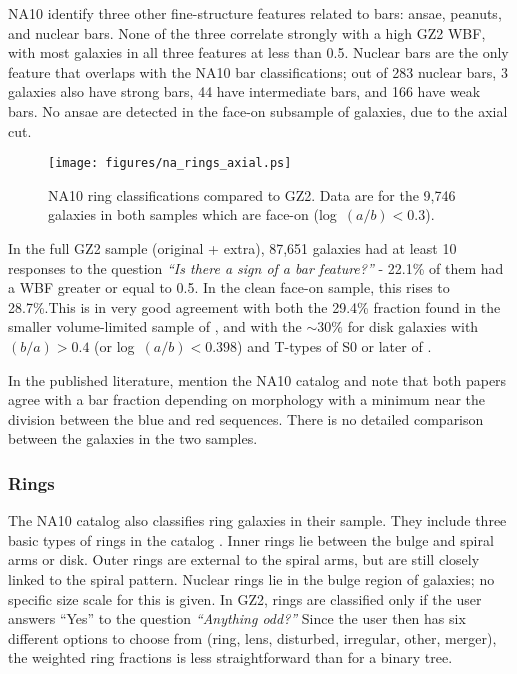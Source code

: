 \documentclass[useAMS,usenatbib]{mn2e}
\begin{document}
NA10 identify three other fine-structure features related to bars: ansae, peanuts, and nuclear bars. None of the three correlate strongly with a high GZ2 WBF, with most galaxies in all three features at less than 0.5. Nuclear bars are the only feature that overlaps with the NA10 bar classifications; out of 283 nuclear bars, 3 galaxies also have strong bars, 44 have intermediate bars, and 166 have weak bars. No ansae are detected in the face-on subsample of galaxies, due to the axial cut. 

\begin{figure*}
\texttt{[image: figures/na\_rings\_axial.ps]}
\caption{NA10 ring classifications compared to GZ2. Data are for the 9,746 galaxies in both samples which are face-on (log~$(a/b)<0.3$). 
\label{fig-na_rings}}
\end{figure*}

In the full GZ2 sample (original + extra), 87,651 galaxies had at least 10 responses to the question {\it ``Is there a sign of a bar feature?''}  - 22.1\% of them had a WBF greater or equal to 0.5. In the clean face-on sample, this rises to 28.7\%.This is in very good agreement with both the 29.4\% fraction found in the smaller volume-limited sample of \citet{mas11c}, and with the $\sim30\%$ for disk galaxies with $(b/a)>0.4$ (or log~$(a/b)<0.398$) and T-types of S0 or later of \citet{nai10a}. 

In the published literature, \citep{mas11c} mention the NA10 catalog and note that both papers agree with a bar fraction depending on morphology with a minimum near the division between the blue and red sequences. There is no detailed comparison between the galaxies in the two samples.

\subsubsection{Rings}

The NA10 catalog also classifies ring galaxies in their sample. They include three basic types of rings in the catalog \citep{but96}. Inner rings lie between the bulge and spiral arms or disk. Outer rings are external to the spiral arms, but are still closely linked to the spiral pattern. Nuclear rings lie in the bulge region of galaxies; no specific size scale for this is given. In GZ2, rings are classified only if the user answers ``Yes'' to the question {\it ``Anything odd?''} Since the user then has six different options to choose from (ring, lens, disturbed, irregular, other, merger), the weighted ring fractions is less straightforward than for a binary tree. 
\end{document}
